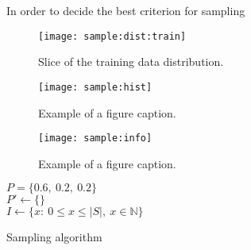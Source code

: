 \documentclass[conference]{IEEEtran}
\begin{document}
In order to decide the best criterion for sampling


\begin{figure}[h]
    \texttt{[image: sample:dist:train]}
    \caption{Slice of the training data distribution. \label{fig:sample:dist:train}}
\end{figure}

\begin{figure*}[h]
    \texttt{[image: sample:hist]}
    \caption{Example of a figure caption. \label{fig:sample:hist}}
\end{figure*}

\begin{figure}[h]
    \texttt{[image: sample:info]}
    \caption{Example of a figure caption. \label{fig:sample:info}}
\end{figure}

\begin{algorithm}
    $P = \{0.6,\ 0.2,\ 0.2\}$\\
    $P' \gets \{\}$\\
    $I \gets \{x:\ 0\leq x\leq \lvert S\rvert,\ x\in\mathbb{N}\}$\\
    \caption{Sampling algorithm}\label{sampling:alg}
\end{algorithm}


\end{document}
